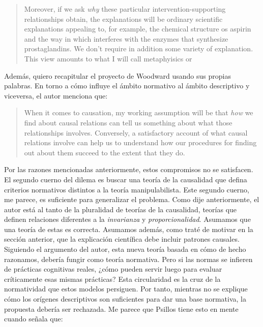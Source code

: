 {{\begin{quote}
  Moreover, if we ask \emph{why} these particular
  intervention-supporting relationships obtain, the
  explanations will be ordinary scientific explanations
  appealing to, for example, the chemical structure os
  aspirin and the way in which interferes with the enzymes
  that synthesize prostaglandins. We don't require in
  addition some variety of  explanation.
  This view amounts to what I will call 
  metaphyisics or 
\end{quote}


Además, quiero recapitular el proyecto de Woodward usando
sus propias palabras. En torno a cómo influye el ámbito
normativo al ámbito descriptivo y viceversa, el autor
menciona que:

  \begin{quote}
    When it comes to causation, my working assumption will
    be that \emph{how} we find about causal relations can
    tell us something about what those relationships
    involves. Conversely, a satisfactory account of what
    causal relations involve can help us to understand how
    our procedures for finding out about them succeed to the
    extent that they do.
  \end{quote}


Por las razones mencionadas anteriormente, estos compromisos
no se satisfacen. El segundo cuerno del dilema es buscar una
teoría de la causalidad que defina criterios normativos
distintos a la teoría manipulabilista. Este segundo cuerno,
me parece, es suficiente para generalizar el problema. Como
dije anteriormente, el autor está al tanto de la pluralidad
de teorías de la causalidad, teorías que definen relaciones
diferentes a la \emph{invarianza} y \emph{proporcionalidad}.
Asumamos que una teoría de estas es correcta. Asumamos
además, como traté de motivar en la sección anterior, que la
explicación científica debe incluir patrones causales.
Siguiendo el argumento del autor, esta nueva teoría basada
en cómo de hecho razonamos, debería fungir como teoría
normativa. Pero si las normas se infieren de prácticas
cognitivas reales, ¿cómo pueden servir luego para evaluar
críticamente esas mismas prácticas? Esta circularidad es la
cruz de la normatividad que estos modelos persiguen. Por
tanto, mientras no se explique cómo los orígenes
descriptivos son suficientes para dar una base normativa, la
propuesta debería ser rechazada. Me parece que Psillos tiene
esto en mente cuando señala que:

}}
